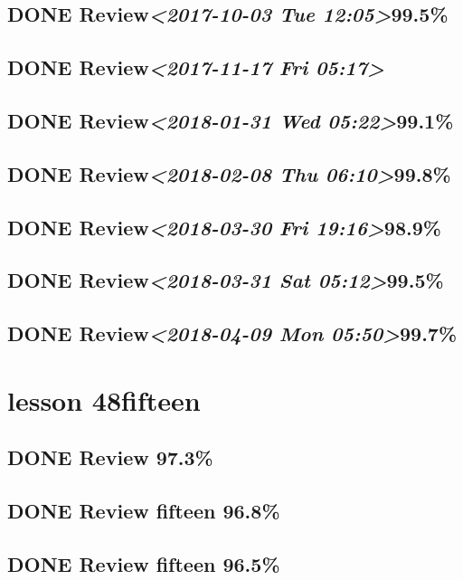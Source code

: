 \documentclass[11pt]{ctexart}
\begin{document}
\subsection{{\bfseries\sffamily DONE} Review\textit{<2017-10-03 Tue 12:05>}99.5\%}
\label{sec:org533bf08}

\subsection{{\bfseries\sffamily DONE} Review\textit{<2017-11-17 Fri 05:17>}}
\label{sec:org05dd12c}
\subsection{{\bfseries\sffamily DONE} Review\textit{<2018-01-31 Wed 05:22>}99.1\%}
\label{sec:org633b927}
\subsection{{\bfseries\sffamily DONE} Review\textit{<2018-02-08 Thu 06:10>}99.8\%}
\label{sec:orgb0a3475}
\subsection{{\bfseries\sffamily DONE} Review\textit{<2018-03-30 Fri 19:16>}98.9\%}
\label{sec:org37c9df4}
\subsection{{\bfseries\sffamily DONE} Review\textit{<2018-03-31 Sat 05:12>}99.5\%}
\label{sec:org4cda42e}
\subsection{{\bfseries\sffamily DONE} Review\textit{<2018-04-09 Mon 05:50>}99.7\%}
\label{sec:orgaa65d61}
\section{lesson 48fifteen}
\label{sec:org55414c1}
\subsection{{\bfseries\sffamily DONE} Review 97.3\%}
\label{sec:org43a04a8}
\subsection{{\bfseries\sffamily DONE} Review fifteen 96.8\%}
\label{sec:org87eb85a}
\subsection{{\bfseries\sffamily DONE} Review fifteen 96.5\%}
\label{sec:orgfd56aec}
\end{document}
